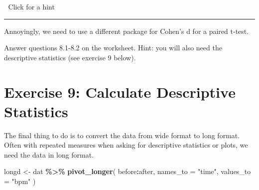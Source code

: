 \documentclass[
]{book}
\newenvironment{Shaded}{\begin{snugshade}}{\end{snugshade}}
\newcommand{\AttributeTok}[1]{\textcolor[rgb]{0.13,0.29,0.53}{#1}}
\newcommand{\CommentTok}[1]{\textcolor[rgb]{0.56,0.35,0.01}{\textit{#1}}}
\newcommand{\ConstantTok}[1]{\textcolor[rgb]{0.56,0.35,0.01}{#1}}
\newcommand{\FunctionTok}[1]{\textcolor[rgb]{0.13,0.29,0.53}{\textbf{#1}}}
\newcommand{\NormalTok}[1]{#1}
\newcommand{\OtherTok}[1]{\textcolor[rgb]{0.56,0.35,0.01}{#1}}
\newcommand{\SpecialCharTok}[1]{\textcolor[rgb]{0.81,0.36,0.00}{\textbf{#1}}}
\newcommand{\StringTok}[1]{\textcolor[rgb]{0.31,0.60,0.02}{#1}}
\let\oldsection\section
\renewcommand{\section}{\needspace{5\baselineskip}\oldsection}
\begin{document}
👀 Click for a hint

\begin{Shaded}
\end{Shaded}

\begin{center}\rule{0.5\linewidth}{0.5pt}\end{center}

Annoyingly, we need to use a different package for Cohen's d for a paired t-test.

\begin{Shaded}
\end{Shaded}

Answer questions 8.1-8.2 on the worksheet. Hint: you will also need the descriptive statistics (see exercise 9 below).

\section{Exercise 9: Calculate Descriptive Statistics}\label{exercise-9-calculate-descriptive-statistics}

The final thing to do is to convert the data from wide format to long format. Often with repeated measures when asking for descriptive statistics or plots, we need the data in long format.

\begin{Shaded}
\begin{Highlighting}[]
\NormalTok{longd }\OtherTok{\textless{}{-}}\NormalTok{ dat }\SpecialCharTok{\%\textgreater{}\%}
  \FunctionTok{pivot\_longer}\NormalTok{(}
\NormalTok{              before}\SpecialCharTok{:}\NormalTok{after,}
              \AttributeTok{names\_to =} \StringTok{"time"}\NormalTok{,}
              \AttributeTok{values\_to =} \StringTok{"bpm"}
\NormalTok{              )}
\end{Highlighting}
\end{Shaded}
\end{document}
